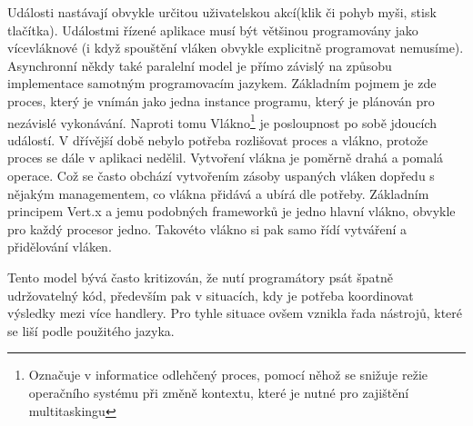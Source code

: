 Události nastávají obvykle určitou uživatelskou akcí(klik či pohyb myši, stisk tlačítka).
Událostmi řízené aplikace musí být většinou programovány jako vícevláknové (i když spouštění vláken obvykle explicitně programovat nemusíme).
Asynchronní někdy také paralelní model je přímo závislý na způsobu implementace samotným programovacím jazykem. Základním pojmem je zde proces, který je vnímán jako jedna instance programu, který je plánován pro nezávislé vykonávání. Naproti tomu Vlákno\footnote{Označuje v informatice odlehčený proces, pomocí něhož se snižuje režie operačního systému při změně kontextu, které je nutné pro zajištění multitaskingu} je posloupnost po sobě jdoucích událostí. V dřívější době nebylo potřeba rozlišovat proces a vlákno, protože proces se dále v aplikaci nedělil. Vytvoření vlákna je poměrně drahá a pomalá operace. Což se často obchází vytvořením zásoby uspaných vláken dopředu s nějakým managementem, co vlákna přidává a ubírá dle potřeby. Základním principem Vert.x a jemu podobných frameworků je jedno hlavní vlákno, obvykle pro každý procesor jedno. Takovéto vlákno si pak samo řídí vytváření a přidělování vláken.

Tento model bývá často kritizován, že nutí programátory psát špatně udržovatelný kód, především pak v situacích, kdy je potřeba koordinovat výsledky mezi více handlery. Pro tyhle situace ovšem vznikla řada nástrojů, které se liší podle použitého jazyka.

